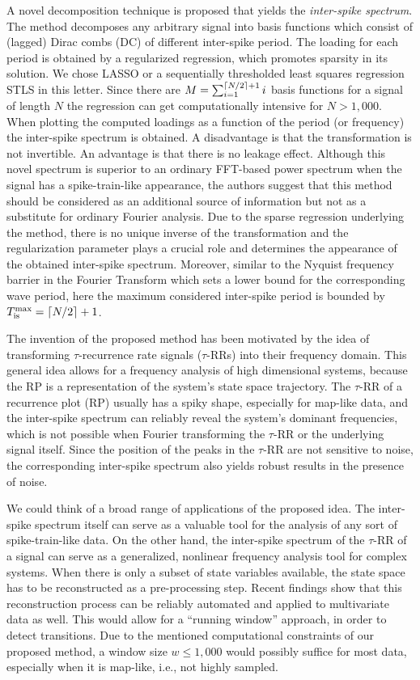 \documentclass[entropy,article,submit,pdftex,moreauthors]{Definitions/mdpi}
\DeclarePairedDelimiter\ceil{\lceil}{\rceil}
\begin{document}
A novel decomposition technique is proposed that yields the \textit{inter-spike spectrum}. The method decomposes any arbitrary signal into basis functions which consist of (lagged) Dirac 
combs (DC) of different inter-spike period. The loading for each period is obtained by a regularized regression, which promotes sparsity in its solution. We chose LASSO or a sequentially 
thresholded least squares regression STLS in this letter. Since there are 
$M = \sum_{i=1}^{\ceil*{N/2}+1}i$ basis functions for a signal of length $N$ the regression can get computationally intensive for $N>1,000$. When plotting the computed loadings as a function 
of the period (or frequency) the inter-spike spectrum is obtained. A disadvantage is that the transformation is not invertible. An advantage is that there is no leakage effect.
Although this novel spectrum is superior to an ordinary FFT-based power spectrum when the signal has a spike-train-like appearance, the authors suggest that this method should 
be considered 
as an additional source of information but not as a substitute for ordinary Fourier analysis. 
Due to the sparse regression underlying the method, there is no unique inverse of the transformation and the regularization parameter plays a crucial role and determines the 
appearance of the obtained inter-spike spectrum. Moreover, similar to the Nyquist frequency barrier in the Fourier Transform which sets a lower bound for the corresponding wave period, here 
the maximum considered inter-spike period is bounded by $T_{\text{is}}^{\text{max}} = \ceil*{N/2}+1$.

The invention of the proposed method has been motivated by the idea of transforming $\tau$-recurrence rate signals ($\tau$-RRs) into their frequency domain. 
This general idea \cite{Zbilut2008} allows for a frequency analysis of high dimensional systems, because the RP is a representation of the system's state space trajectory.   
The $\tau$-RR of a recurrence plot (RP) usually has a spiky shape, especially for map-like data, and the inter-spike spectrum can reliably reveal the system's dominant frequencies, 
which is not possible when Fourier transforming the $\tau$-RR or the underlying signal itself. Since the position of the peaks 
in the $\tau$-RR are not sensitive to noise, the corresponding inter-spike spectrum also yields robust results in the presence of noise. 

We could think of a broad range of applications of the proposed idea. The inter-spike spectrum itself can serve as a valuable tool for the analysis of any sort of 
spike-train-like data. On the other hand, the inter-spike spectrum of the $\tau$-RR of a signal can serve as a generalized, nonlinear frequency analysis tool for complex systems. 
When there is only a subset of state variables available, the state space has to be reconstructed as a pre-processing step. Recent findings \cite{Kraemer2021,Kraemer2022} show that 
this reconstruction process can be reliably automated and applied to multivariate data as well. This would allow for a ``running window'' approach, in order to detect transitions. 
Due to the mentioned computational constraints of our proposed method, a window size $w\leq 1,000$ would possibly suffice for most data, especially when it is map-like, i.e., not 
highly sampled. 
\end{document}
